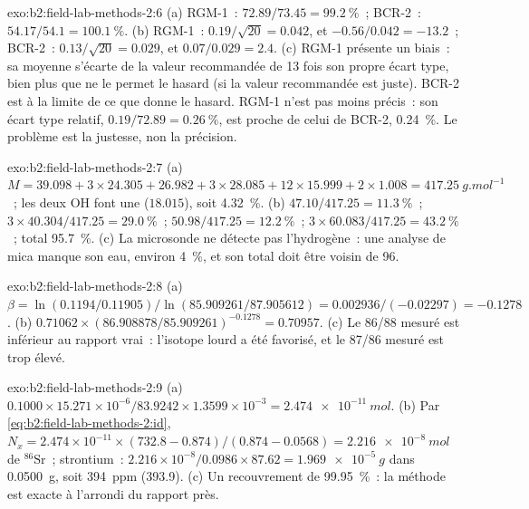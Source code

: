 \begin{solution}{exo:b2:field-lab-methods-2:6}
(a) RGM-1~: $72.89/73.45 = \qty{99.2}{\percent}$~; BCR-2~: $54.17/54.1 = \qty{100.1}{\percent}$.
(b) RGM-1~: $0.19/\sqrt{20} = 0.042$, et $-0.56/0.042 = -13.2$~; BCR-2~: $0.13/\sqrt{20} = 0.029$, et
$0.07/0.029 = 2.4$. (c) RGM-1 présente un biais~: sa moyenne s'écarte de la valeur recommandée de 13 fois son propre
écart type, bien plus que ne le permet le hasard (si la valeur recommandée est juste). BCR-2 est à la
limite de ce que donne le hasard. RGM-1 n'est pas moins précis~: son écart type relatif,
$0.19/72.89 = \qty{0.26}{\percent}$, est proche de celui de BCR-2, \qty{0.24}{\percent}. Le problème est
la justesse, non la précision.
\end{solution}

\begin{solution}{exo:b2:field-lab-methods-2:7}
(a) $M = 39.098 + 3 \times 24.305 + 26.982 + 3 \times 28.085 + 12 \times 15.999 + 2 \times 1.008 =
\qty{417.25}{g.mol^{-1}}$~; les deux OH font une  ($18.015$), soit \qty{4.32}{\percent}.
(b)  $47.10/417.25 = \qty{11.3}{\percent}$~;  $3 \times 40.304/417.25 =
\qty{29.0}{\percent}$~;  $50.98/417.25 = \qty{12.2}{\percent}$~;  $3 \times
60.083/417.25 = \qty{43.2}{\percent}$~; total \qty{95.7}{\percent}. (c) La microsonde ne détecte pas l'hydrogène~: une analyse de mica
manque son eau, environ \qty{4}{\percent}, et son total doit être voisin de
96.
\end{solution}

\begin{solution}{exo:b2:field-lab-methods-2:8}
(a) $\beta = \ln(0.1194/0.11905)/\ln(85.909261/87.905612) = 0.002936/(-0.02297) = -0.1278$.
(b) $0.71062 \times (86.908878/85.909261)^{-0.1278} = 0.70957$. (c) Le 86/88 mesuré est inférieur au
rapport vrai~: l'isotope lourd a été favorisé, et le 87/86 mesuré est trop élevé.
\end{solution}

\begin{solution}{exo:b2:field-lab-methods-2:9}
(a) $0.1000 \times 15.271 \times 10^{-6}/83.9242 \times 1.3599 \times 10^{-3} = \qty{2.474e-11}{mol}$.
(b) Par \eqref{eq:b2:field-lab-methods-2:id}, $N_x = 2.474 \times 10^{-11} \times (732.8 -
0.874)/(0.874 - 0.0568) = \qty{2.216e-8}{mol}$ de $^{86}\mathrm{Sr}$~; strontium~: $2.216 \times
10^{-8}/0.0986 \times 87.62 = \qty{1.969e-5}{g}$ dans \qty{0.0500}{g}, soit \qty{394}{ppm} (393.9).
(c) Un recouvrement de \qty{99.95}{\percent}~: la méthode est exacte à l'arrondi du rapport près.
\end{solution}

